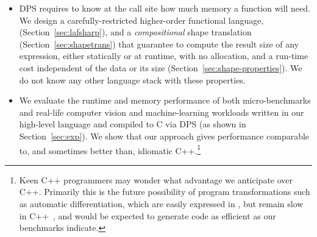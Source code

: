 \begin{itemize}
\item DPS requires to know at the call site how much memory a function will need.
We design a carefully-restricted higher-order functional language, \lafsharp{} (Section~\ref{sec:lafsharp}), and a
\emph{compositional} shape translation (Section~\ref{sec:shapetrans}) that guarantee
to compute the result size of any \lafsharp{} expression, either statically
or at runtime, with no allocation, and a run-time cost independent of the data or its size (Section~\ref{sec:shape-properties}).
We do not know any other language stack with these properties.
 
\item We evaluate the runtime and memory performance of both micro-benchmarks and real-life computer vision and machine-learning workloads written in our high-level language and compiled to C via DPS (as shown in Section~\ref{sec:exp}).
We show that our approach gives performance comparable to, and sometimes better than, idiomatic C++.\!\footnote{Keen C++ programmers may wonder what advantage we anticipate over C++. Primarily this is the future possibility of program transformations such as automatic differentiation, which are easily expressed in \lafsharp{}, but remain slow in C++~\cite{srajerbenchmark}, and would be expected to generate code as efficient as our benchmarks indicate.}
\end{itemize}
